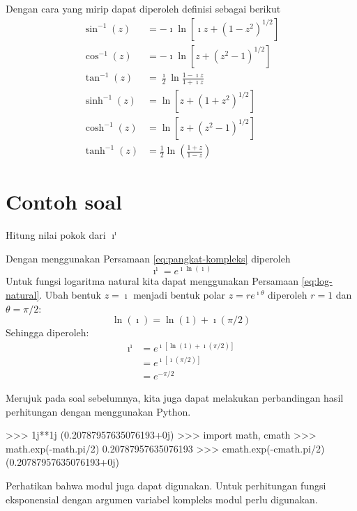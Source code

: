 Dengan cara yang mirip dapat diperoleh definisi sebagai berikut
\begin{align}
\sin^{-1}(z) & = -\imath \ln\left[\imath z+\left(1-z^{2}\right)^{1/2}\right] \label{eq:inv-sin-z}\\
\cos^{-1}(z) & = -\imath \ln\left[z+\left(z^{2}-1\right)^{1/2}\right] \\
\tan^{-1}(z) & = \frac{\imath }{2}\ln\frac{1-\imath z}{1+\imath z} \\
\sinh^{-1}(z) & = \ln\left[z + \left(1+z^{2} \right)^{1/2}\right] \\
\cosh^{-1}(z) & = \ln\left[z + \left(z^{2} - 1\right)^{1/2}\right] \\
\tanh^{-1}(z) & = \frac{1}{2} \ln\left( \frac{1+z}{1-z} \right)
\end{align}


\section{Contoh soal}

\begin{contoh}
Hitung nilai pokok dari $\imath^{\imath}$

Dengan menggunakan Persamaan \eqref{eq:pangkat-kompleks} diperoleh
\begin{equation*}
\imath^{\imath} = e^{\imath \ln(\imath)}
\end{equation*}
Untuk fungsi logaritma natural kita dapat menggunakan Persamaan \ref{eq:log-natural}.
Ubah bentuk $z=\imath$ menjadi bentuk polar $z = r e^{\imath \theta}$ diperoleh
$r = 1$ dan $\theta = \pi/2$:
\begin{equation*}
\ln(\imath) = \ln(1) + \imath (\pi/2)
\end{equation*}
Sehingga diperoleh:
\begin{align*}
\imath^{\imath} & = e^{\imath\left[ \ln(1) + \imath (\pi/2) \right]} \\
& = e^{\imath\left[ \imath (\pi/2) \right]} \\
& = e^{-\pi/2}
\end{align*}

\end{contoh}

Merujuk pada soal sebelumnya, kita juga dapat melakukan
perbandingan hasil perhitungan dengan menggunakan Python.
\begin{pyconcode}
>>> 1j**1j
(0.20787957635076193+0j)
>>> import math, cmath
>>> math.exp(-math.pi/2)
0.20787957635076193
>>> cmath.exp(-cmath.pi/2)
(0.20787957635076193+0j)
\end{pyconcode}
Perhatikan bahwa modul  juga dapat digunakan. Untuk perhitungan
fungsi eksponensial dengan argumen variabel kompleks modul 
perlu digunakan.


